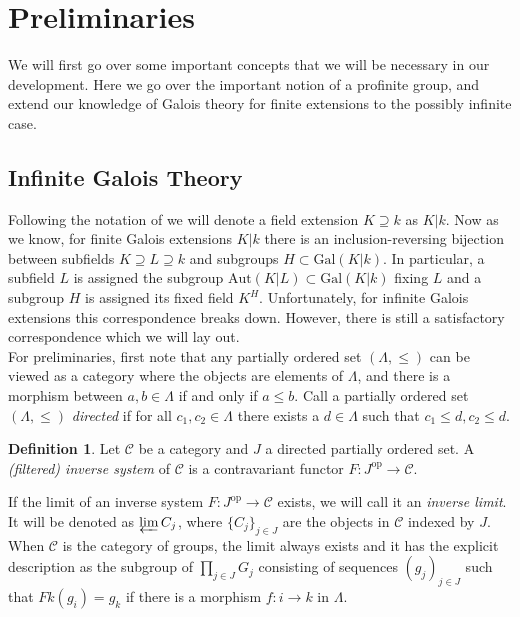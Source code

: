 \documentclass{article}
\theoremstyle{definition}
\newtheorem{definition}[theorem]{Definition}
\theoremstyle{remark}
\theoremstyle{plain}
\newcommand{\mc}[1]{\mathcal{#1}}
\begin{document}
\section{Preliminaries}
We will first go over some important concepts that we will be necessary in our development.
Here we go over the important notion of a profinite group, and extend our knowledge of Galois theory for finite extensions to the possibly infinite case.

\subsection{Infinite Galois Theory}

Following the notation of \cite{Szamuely} we will denote a field extension $K \supseteq k$ as $K|k$. 
Now as we know, for finite Galois extensions $K|k$ there is an inclusion-reversing bijection between subfields $K \supseteq L \supseteq k$ and subgroups $H \subset \text{Gal}(K|k)$.
In particular, a subfield $L$ is assigned the subgroup $\text{Aut}(K|L) \subset \text{Gal}(K|k)$ fixing $L$ and a subgroup $H$ is assigned its fixed field $K^H$.
Unfortunately, for infinite Galois extensions this correspondence breaks down.
However, there is still a satisfactory correspondence which we will lay out.\\

For preliminaries, first note that any partially ordered set $(\Lambda, \leq)$ can be viewed as a category where the objects are elements of $\Lambda$, and there is a morphism between $a,b \in \Lambda$ if and only if $a \leq b$.
Call a partially ordered set $(\Lambda, \leq)$ \textit{directed} if for all $c_1, c_2 \in \Lambda$ there exists a $d \in \Lambda$ such that $c_1 \leq d, c_2 \leq d$.

\begin{definition}
	Let $\mc{C}$ be a category and $J$ a directed partially ordered set. A \textit{(filtered) inverse system} of $\mc{C}$ is a contravariant functor $F: J^{\text{op}} \to \mc{C}$.
\end{definition}

If the limit of an inverse system $F: J^{\text{op}} \to \mc{C}$ exists, we will call it an \textit{inverse limit}.
It will be denoted as $\varprojlim C_{j}$, where $\{C_j\}_{j \in J}$ are the objects in $\mc{C}$ indexed by $J$.
When $\mc{C}$ is the category of groups, the limit always exists and it has the explicit description as the subgroup of $\prod_{j \in J} G_j$ consisting of sequences $(g_j)_{j \in J}$ such that $Fk(g_i) = g_k$ if there is a morphism $f: i  \to k$ in $\Lambda$.
\end{document}
